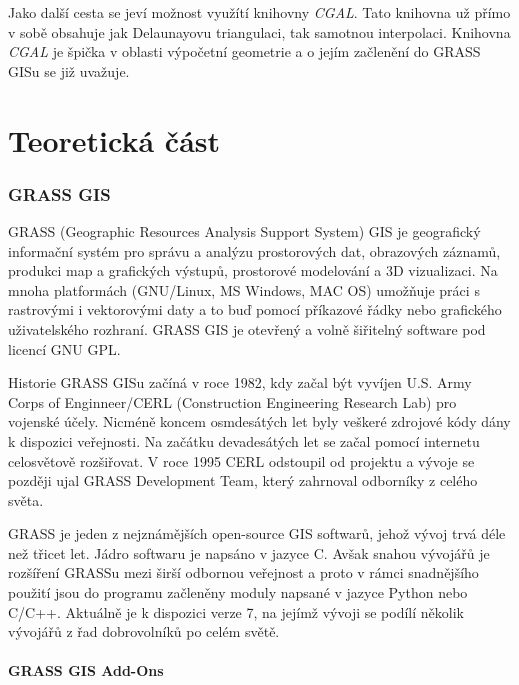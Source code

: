 \documentclass[12pt,a4paper]{article}
\begin{document}
Jako další cesta se jeví možnost využítí knihovny \emph{CGAL}. Tato
knihovna už přímo v sobě obsahuje jak Delaunayovu triangulaci, tak
samotnou interpolaci. Knihovna \emph{CGAL} je špička v oblasti
výpočetní geometrie a o jejím začlenění do GRASS GISu se již uvažuje.

\newpage
\part{Teoretická část}

\newpage
\section{GRASS GIS}

GRASS (Geographic Resources Analysis Support System)
GIS je geografický informační systém
pro správu a analýzu prostorových dat, obrazových záznamů, produkci
map a grafických výstupů, prostorové modelování a 3D vizualizaci. Na
mnoha platformách (GNU/Linux, MS Windows, MAC OS) umožňuje práci s
rastrovými i vektorovými daty a to buď pomocí příkazové řádky nebo
grafického uživatelského rozhraní. GRASS GIS je otevřený a volně
šiřitelný software pod licencí GNU GPL.

Historie\cite{rukovet} GRASS GISu začíná v roce 1982, kdy začal být
vyvíjen U.S. Army Corps of Enginneer/CERL (Construction Engineering
Research Lab) pro vojenské účely. Nicméně koncem osmdesátých let byly
veškeré zdrojové kódy dány k dispozici veřejnosti. Na začátku
devadesátých let se začal pomocí internetu celosvětově rozšiřovat. V
roce 1995 CERL odstoupil od projektu a vývoje se později ujal GRASS
Development Team, který zahrnoval odborníky z celého světa.

GRASS je jeden z nejznámějších open-source GIS softwarů, jehož vývoj
trvá déle než třicet let. Jádro softwaru je napsáno v jazyce C. Avšak
snahou vývojářů je rozšíření GRASSu mezi širší odbornou veřejnost a
proto v rámci snadnějšího použití jsou do programu začleněny moduly
napsané v jazyce Python nebo C/C++. Aktuálně je k dispozici verze 7, na
jejímž vývoji se podílí několik vývojářů z řad dobrovolníků po celém
světě.

\subsection{GRASS GIS Add-Ons}
\label{sub:addons}
\end{document}
